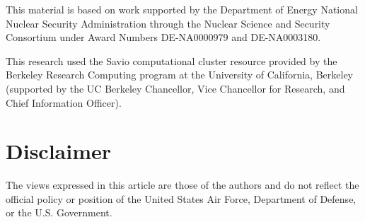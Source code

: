 \documentclass{article}                                                                           %
\begin{document}
This material is based on work supported by the Department of Energy National Nuclear Security Administration through the Nuclear Science and Security Consortium under Award Numbers DE-NA0000979 and DE-NA0003180. 

This research used the Savio computational cluster resource provided by the Berkeley Research Computing program at the University of California, Berkeley (supported by the UC Berkeley Chancellor, Vice Chancellor for Research, and Chief Information Officer).

\section*{Disclaimer}
The views expressed in this article are those of the authors and do not reflect the official policy or position of the United States Air Force, Department of Defense, or the U.S. Government.






%




\end{document}
